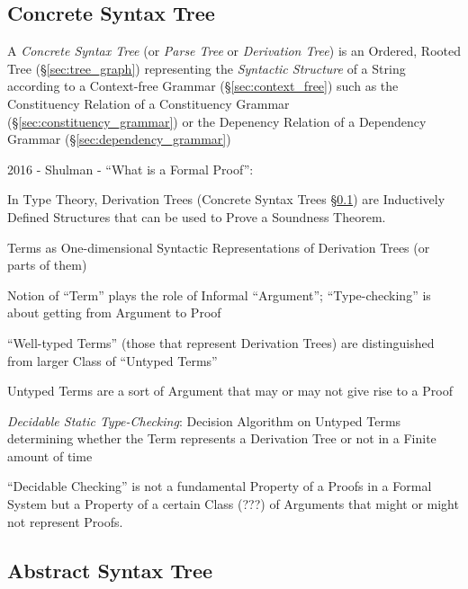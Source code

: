 \subsection{Concrete Syntax Tree}\label{sec:concrete_syntax}

A \emph{Concrete Syntax Tree} (or \emph{Parse Tree} or
\emph{Derivation Tree}) is an Ordered, Rooted Tree
(\S\ref{sec:tree_graph}) representing the \emph{Syntactic Structure}
of a String according to a Context-free Grammar
(\S\ref{sec:context_free}) such as the Constituency Relation of a
Constituency Grammar (\S\ref{sec:constituency_grammar}) or the
Depenency Relation of a Dependency Grammar
(\S\ref{sec:dependency_grammar})


2016 - Shulman - ``What is a Formal Proof'': %

In Type Theory, Derivation Trees (Concrete Syntax Trees
\S\ref{sec:concrete_syntax}) are Inductively Defined Structures that
can be used to Prove a Soundness Theorem.

Terms as One-dimensional Syntactic Representations of Derivation Trees
(or parts of them)

Notion of ``Term'' plays the role of Informal ``Argument'';
``Type-checking'' is about getting from Argument to Proof

``Well-typed Terms'' (those that represent Derivation Trees) are
distinguished from larger Class of ``Untyped Terms''

Untyped Terms are a sort of Argument that may or may not give rise to
a Proof

\emph{Decidable Static Type-Checking}: Decision Algorithm on Untyped
Terms determining whether the Term represents a Derivation Tree or not
in a Finite amount of time

``Decidable Checking'' is not a fundamental Property of a Proofs in a
Formal System but a Property of a certain Class (???) of Arguments
that might or might not represent Proofs.



\subsection{Abstract Syntax Tree}\label{sec:abstract_syntax}

